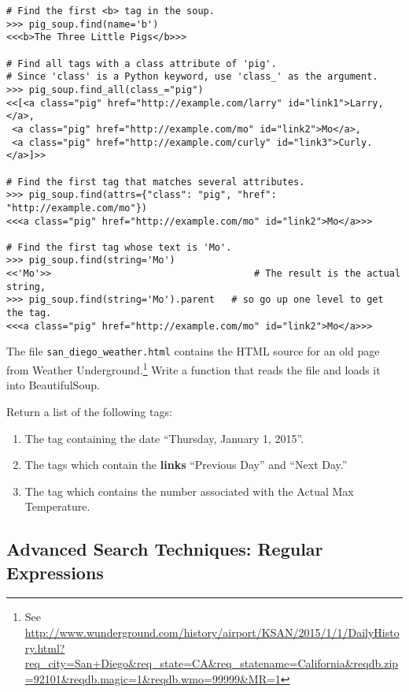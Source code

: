 \begin{lstlisting}
# Find the first <b> tag in the soup.
>>> pig_soup.find(name='b')
<<<b>The Three Little Pigs</b>>>

# Find all tags with a class attribute of 'pig'.
# Since 'class' is a Python keyword, use 'class_' as the argument.
>>> pig_soup.find_all(class_="pig")
<<[<a class="pig" href="http://example.com/larry" id="link1">Larry,</a>,
 <a class="pig" href="http://example.com/mo" id="link2">Mo</a>,
 <a class="pig" href="http://example.com/curly" id="link3">Curly.</a>]>>

# Find the first tag that matches several attributes.
>>> pig_soup.find(attrs={"class": "pig", "href": "http://example.com/mo"})
<<<a class="pig" href="http://example.com/mo" id="link2">Mo</a>>>

# Find the first tag whose text is 'Mo'.
>>> pig_soup.find(string='Mo')
<<'Mo'>>                                    # The result is the actual string,
>>> pig_soup.find(string='Mo').parent   # so go up one level to get the tag.
<<<a class="pig" href="http://example.com/mo" id="link2">Mo</a>>>
\end{lstlisting}

\begin{problem}
The file \texttt{san\_diego\_weather.html} contains the HTML source for an old page from Weather Underground.\footnote{See \url{http://www.wunderground.com/history/airport/KSAN/2015/1/1/DailyHistory.html?req_city=San+Diego&req_state=CA&req_statename=California&reqdb.zip=92101&reqdb.magic=1&reqdb.wmo=99999&MR=1}}
Write a function that reads the file and loads it into BeautifulSoup.

Return a list of the following tags:
\begin{enumerate}
\item The tag containing the date ``Thursday, January 1, 2015''.
\item The tags which contain the \textbf{links} ``Previous Day'' and ``Next Day.''
\item The tag which contains the number associated with the Actual Max Temperature.
\end{enumerate}
\end{problem}

\subsection*{Advanced Search Techniques: Regular Expressions} %

